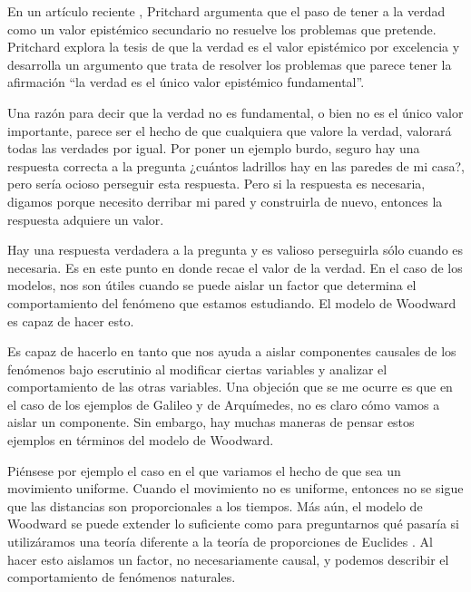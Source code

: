 \noindent En un artículo reciente \cite{Pritchard2019}, Pritchard argumenta que el paso de tener a la verdad como un valor epistémico secundario no resuelve los problemas que pretende. Pritchard explora la tesis de que la verdad es el valor epistémico por excelencia y desarrolla un argumento que trata de resolver los problemas que parece tener la afirmación ``la verdad es el único valor epistémico fundamental''.

Una razón para decir que la verdad no es fundamental, o bien no es el único valor importante, parece ser el hecho de que cualquiera que valore la verdad, valorará todas las verdades por igual. Por poner un ejemplo burdo, seguro hay una respuesta correcta a la pregunta ¿cuántos ladrillos hay en las paredes de mi casa?, pero sería ocioso perseguir esta respuesta. Pero si la respuesta es necesaria, digamos porque necesito derribar mi pared y construirla de nuevo, entonces la respuesta adquiere un valor.

Hay una respuesta verdadera a la pregunta y es valioso perseguirla sólo cuando es necesaria. Es en este punto en donde recae el valor de la verdad. En el caso de los modelos, nos son útiles cuando se puede aislar un factor que determina el comportamiento del fenómeno que estamos estudiando. El modelo de Woodward es capaz de hacer esto.

Es capaz de hacerlo en tanto que nos ayuda a aislar componentes causales de los fenómenos bajo escrutinio al modificar ciertas variables y analizar el comportamiento de las otras variables. Una objeción que se me ocurre es que en el caso de los ejemplos de Galileo y de Arquímedes, no es claro cómo vamos a aislar un componente. Sin embargo, hay muchas maneras de pensar estos ejemplos en términos del modelo de Woodward.

Piénsese por ejemplo el caso en el que variamos el hecho de que sea un movimiento uniforme. Cuando el movimiento no es uniforme, entonces no se sigue que las distancias son proporcionales a los tiempos. Más aún, el modelo de Woodward se puede extender lo suficiente como para preguntarnos qué pasaría si utilizáramos una teoría diferente a la teoría de proporciones de Euclides \cite{Woodward2018}. Al hacer esto aislamos un factor, no necesariamente causal, y podemos describir el comportamiento de fenómenos naturales.

